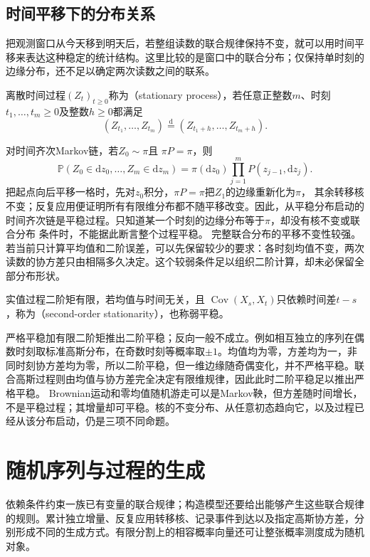 \subsection{时间平移下的分布关系}
\label{sec:rv-stationarity}
把观测窗口从今天移到明天后，若整组读数的联合规律保持不变，就可以用时间平移来表达这种稳定的统计结构。这里比较的是窗口中的联合分布；仅保持单时刻的边缘分布，还不足以确定两次读数之间的联系。
\begin{definition}[平稳过程]
  \label{def:stoch-stationary-process}
  离散时间过程\((Z_t)_{t\geq0}\)称为（stationary process），若任意正整数\(m\)、时刻\(t_1,\ldots,t_m\geq0\)及整数\(h\geq0\)都满足
  \[ (Z_{t_1},\ldots,Z_{t_m})\overset{\mathrm d}{=}(Z_{t_1+h},\ldots,Z_{t_m+h}). \]
\end{definition}
对时间齐次Markov链，若$Z_0\sim\pi$且
$\pi P=\pi$，则
\[
  \mathbb{P}(Z_0\in\mathrm{d}z_0,\ldots,Z_m\in\mathrm{d}z_m)
  =
  \pi(\mathrm{d}z_0)
  \prod_{j=1}^{m}P(z_{j-1},\mathrm{d}z_j).
\]
把起点向后平移一格时，先对$z_0$积分，$\pi P=\pi$把$Z_1$的边缘重新化为$\pi$，
其余转移核不变；反复应用便证明所有有限维分布都不随平移改变。因此，从平稳分布启动的
时间齐次链是平稳过程。只知道某一个时刻的边缘分布等于$\pi$，却没有核不变或联合分布
条件时，不能据此断言整个过程平稳。
完整联合分布的平移不变性较强。若当前只计算平均值和二阶误差，可以先保留较少的要求：各时刻均值不变，两次读数的协方差只由相隔多久决定。这个较弱条件足以组织二阶计算，却未必保留全部分布形状。
\begin{definition}[二阶平稳]
\label{def:rv-second-order-stationary}
实值过程二阶矩有限，若均值与时间无关，且
\(\operatorname{Cov}(X_s,X_t)\)只依赖时间差\(t-s\)，称为（second-order stationarity），也称弱平稳。
\end{definition}
严格平稳加有限二阶矩推出二阶平稳；反向一般不成立。例如相互独立的序列在偶数时刻取标准高斯分布，在奇数时刻等概率取\(\pm1\)。均值均为零，方差均为一，非同时刻协方差均为零，所以二阶平稳，但一维边缘随奇偶变化，并不严格平稳。联合高斯过程则由均值与协方差完全决定有限维规律，因此此时二阶平稳足以推出严格平稳。
Brownian运动和零均值随机游走可以是Markov鞅，但方差随时间增长，不是平稳过程；其增量却可平稳。核的不变分布、从任意初态趋向它，以及过程已经从该分布启动，仍是三项不同命题。

\section{随机序列与过程的生成}
\label{sec:stoch-sequence-process-generation}
依赖条件约束一族已有变量的联合规律；构造模型还要给出能够产生这些联合规律的规则。累计独立增量、反复应用转移核、记录事件到达以及指定高斯协方差，分别形成不同的生成方式。有限分割上的相容概率向量还可让整张概率测度成为随机对象。

